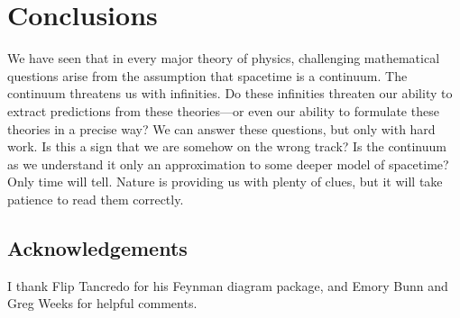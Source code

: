 \documentclass{article}
\begin{document}
\section{Conclusions}

We have seen that in every major theory of physics, challenging mathematical 
questions arise from the assumption that spacetime is a continuum.  The continuum threatens us with infinities.  Do these infinities threaten our ability to extract predictions from these theories---or even our ability to formulate these theories in a precise way?   We can answer these questions, but only with hard work.   Is this a sign that we are somehow on the wrong track?  Is the continuum as we understand it only an approximation to some deeper model of spacetime?   Only time will tell.   Nature is providing us with plenty of clues, but it will take patience to read them correctly.

\subsection*{Acknowledgements}

I thank Flip Tancredo for his Feynman diagram package, and Emory Bunn and Greg Weeks for helpful comments.
\end{document}
